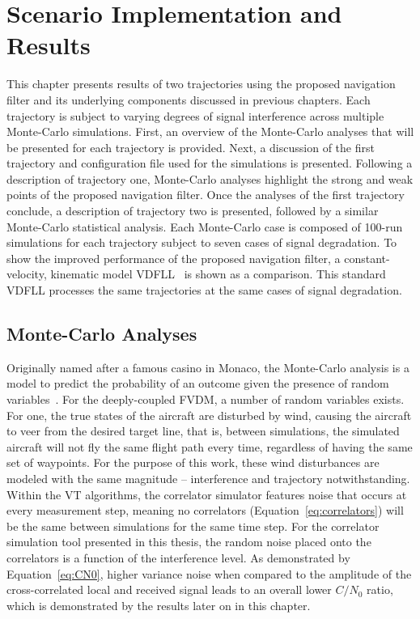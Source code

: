 \chapter{\textbf{Scenario Implementation and Results}}
This chapter presents results of two trajectories using the proposed navigation filter and its underlying components discussed in previous chapters. Each trajectory is subject to varying degrees of signal interference across multiple Monte-Carlo simulations. First, an overview of the Monte-Carlo analyses that will be presented for each trajectory is provided. Next, a discussion of the first trajectory and configuration file used for the simulations is presented. Following a description of trajectory one, Monte-Carlo analyses highlight the strong and weak points of the proposed navigation filter. Once the analyses of the first trajectory conclude, a description of trajectory two is presented, followed by a similar Monte-Carlo statistical analysis. Each Monte-Carlo case is composed of 100-run simulations for each trajectory subject to seven cases of signal degradation. To show the improved performance of the proposed navigation filter, a constant-velocity, kinematic model VDFLL~\cite{grierPositionNavigationTiming} is shown as a comparison. This standard VDFLL processes the same trajectories at the same cases of signal degradation.

\section{\textbf{Monte-Carlo Analyses}}
Originally named after a famous casino in Monaco, the Monte-Carlo analysis is a model to predict the probability of an outcome given the presence of random variables~\cite{mariettaMonteCarloError2013}. For the deeply-coupled FVDM, a number of random variables exists. For one, the true states of the aircraft are disturbed by wind, causing the aircraft to veer from the desired target line, that is, between simulations, the simulated aircraft will not fly the same flight path every time, regardless of having the same set of waypoints. For the purpose of this work, these wind disturbances are modeled with the same magnitude {--} interference and trajectory notwithstanding. Within the VT algorithms, the correlator simulator features noise that occurs at every measurement step, meaning no correlators (Equation~\ref{eq:correlators}) will be the same between simulations for the same time step. For the correlator simulation tool presented in this thesis, the random noise placed onto the correlators is a function of the interference level. As demonstrated by Equation~\ref{eq:CN0}, higher variance noise when compared to the amplitude of the cross-correlated local and received signal leads to an overall lower \(C/N_0\) ratio, which is demonstrated by the results later on in this chapter.

